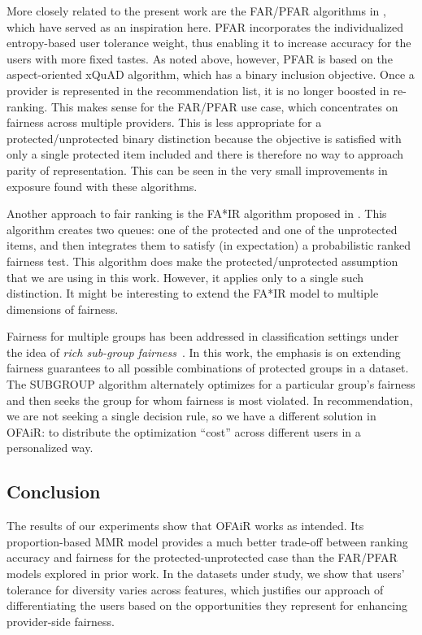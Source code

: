 More closely related to the present work are the FAR/PFAR algorithms in \cite{liu2018personalizing,liu2019personalized}, which have served as an inspiration here. PFAR incorporates the individualized entropy-based user tolerance weight, thus enabling it to increase accuracy for the users with more fixed tastes. As noted above, however, PFAR is based on the aspect-oriented xQuAD algorithm, which has a binary inclusion objective. Once a provider is represented in the recommendation list, it is no longer boosted in re-ranking. This makes sense for the FAR/PFAR use case, which concentrates on fairness across multiple providers. This is less appropriate for a protected/unprotected binary distinction because the objective is satisfied with only a single protected item included and there is therefore no way to approach parity of representation. This can be seen in the very small improvements in exposure found with these algorithms. 

Another approach to fair ranking is the FA*IR algorithm proposed in \cite{zehlike2017fa}. This algorithm creates two queues: one of the protected and one of the unprotected items, and then integrates them to satisfy (in expectation) a probabilistic ranked fairness test. This algorithm does make the protected/unprotected assumption that we are using in this work. However, it applies only to a single such distinction. It might be interesting to extend the FA*IR model to multiple dimensions of fairness.

Fairness for multiple groups has been addressed in classification settings under the idea of \textit{rich sub-group fairness}~\cite{kearns2017preventing,kearns2019empirical}. In this work, the emphasis is on extending fairness guarantees to all possible combinations of protected groups in a dataset. The SUBGROUP algorithm alternately optimizes for a particular group's fairness and then seeks the group for whom fairness is most violated. In recommendation, we are not seeking a single decision rule, so we have a different solution in OFAiR: to distribute the optimization ``cost'' across different users in a personalized way.

\subsection{Conclusion}
\label{subsec:ofair_conclusion}

The results of our experiments show that OFAiR works as intended. Its proportion-based MMR model provides a much better trade-off between ranking accuracy and fairness for the protected-unprotected case than the FAR/PFAR models explored in prior work. In the datasets under study, we show that users' tolerance for diversity varies across features, which justifies our approach of differentiating the users based on the opportunities they represent for enhancing provider-side fairness. 

